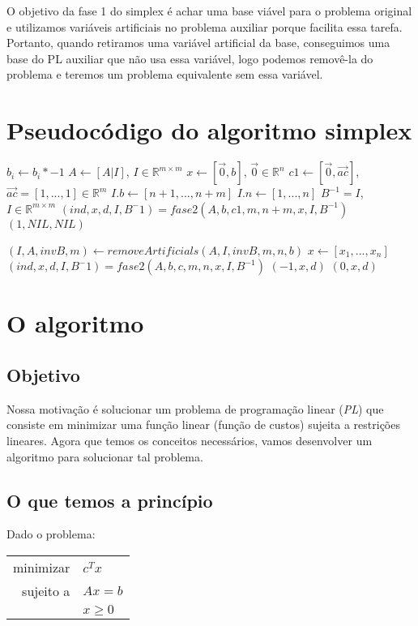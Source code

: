 \documentclass[12pt]{article}
\begin{document}
O objetivo da fase 1 do simplex é achar uma base viável para o problema original e utilizamos variáveis artificiais no problema auxiliar porque facilita essa tarefa. Portanto, quando retiramos uma variável artificial da base, conseguimos uma base do PL auxiliar que não usa essa variável, logo podemos removê-la do problema e teremos um problema equivalente sem essa variável.


	
	
	
\section{Pseudocódigo do algoritmo simplex}
\begin{algorithmic}
		\State $b_i \gets b_i * -1$
	\EndFor
	\State $A \gets [A | I]$, $I \in \mathbb{R}^{m \times m}$
	\State $x \gets [\vec{0}, b]$, $\vec{0} \in \mathbb{R}^{n}$
	\State $c1 \gets [\vec{0}, \vec{ac}]$, $\vec{ac} = [1, ..., 1] \in \mathbb{R}^m$
	\State $I.b \gets [n + 1, ..., n + m]$
	\State $I.n \gets [1, ..., n]$
	\State $B^{-1} = I$, $I \in \mathbb{R}^{m \times m}$
	\State $(ind, x, d, I, B^-1) = fase2(A, b, c1, m, n + m, x, I, B^{-1})$
		\Return $(1, NIL, NIL)$
	
	\EndIf
	\State $(I, A, invB, m) \gets removeArtificials (A, I, invB, m, n, b)$
	\State $x \gets [x_1, ..., x_n]$
	\State $(ind, x, d, I, B^-1) = fase2(A, b, c, m, n, x, I, B^{-1})$
		\Return $(-1, x, d)$
	\Else
		\Return $(0, x, d)$
	\EndIf
\EndFunction
\end{algorithmic}

\section{O algoritmo}

\subsection{Objetivo}
	Nossa motivação é solucionar um problema de programação linear (\emph{PL}) que consiste em minimizar uma função linear (função de custos) sujeita a restrições lineares. Agora que temos os conceitos necessários, vamos desenvolver um algoritmo para solucionar tal problema.

\subsection{O que temos a princípio}
\label{fase2:args}
	Dado o problema:
    \begin{center}
    	\begin{tabular}{r l}
	  		minimizar & $c^Tx$ \\
        
        	sujeito a & $Ax = b$ \\
            & $x \geq 0$ \\
        \end{tabular}
    \end{center}
  
\end{document}
